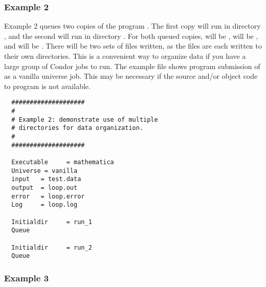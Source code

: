 \subsubsection{Example 2}

Example 2 queues two copies of the program . The
first copy will run in directory , and the second will run in
directory . For both queued copies, 
 will be ,
 will be , and
 will be .
There will be two sets of files written,
as the files are each written to their own directories.
This is a convenient way to organize data if you
have a large group of Condor jobs to run. The example file 
shows program submission of
 as a vanilla universe job.
This may be necessary if the source
and/or object code to program  is not available.
\begin{verbatim}
  ####################     
  #                       
  # Example 2: demonstrate use of multiple     
  # directories for data organization.      
  #                                        
  ####################                    
                                         
  Executable     = mathematica          
  Universe = vanilla                   
  input   = test.data                
  output  = loop.out                
  error   = loop.error             
  Log     = loop.log                                                    
                                  
  Initialdir     = run_1         
  Queue                         
                               
  Initialdir     = run_2      
  Queue                     
\end{verbatim}

\subsubsection{Example 3}

